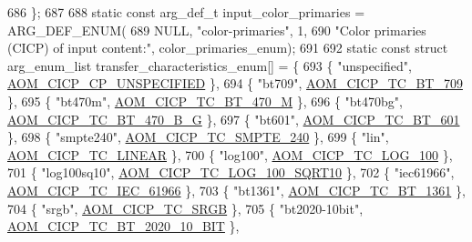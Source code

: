\begin{DoxyCodeInclude}
{{{{{{{686 \};
687 
688 \textcolor{keyword}{static} \textcolor{keyword}{const} arg\_def\_t input\_color\_primaries = ARG\_DEF\_ENUM(
689     NULL, \textcolor{stringliteral}{"color-primaries"}, 1,
690     \textcolor{stringliteral}{"Color primaries (CICP) of input content:"}, color\_primaries\_enum);
691 
692 \textcolor{keyword}{static} \textcolor{keyword}{const} \textcolor{keyword}{struct }arg\_enum\_list transfer\_characteristics\_enum[] = \{
693   \{ \textcolor{stringliteral}{"unspecified"}, \hyperlink{aom__image_8h_a5267ad095a088ece3499336812503cefa0835a3af8e6ffc6df298b6e64f878431}{AOM\_CICP\_CP\_UNSPECIFIED} \},
694   \{ \textcolor{stringliteral}{"bt709"}, \hyperlink{aom__image_8h_a30655997e3fb79889ee23eb294cb1992affe340e422646b7d70ef91edd6a8053c}{AOM\_CICP\_TC\_BT\_709} \},
695   \{ \textcolor{stringliteral}{"bt470m"}, \hyperlink{aom__image_8h_a30655997e3fb79889ee23eb294cb1992a356d6943d11d88e7a42370c1c698c214}{AOM\_CICP\_TC\_BT\_470\_M} \},
696   \{ \textcolor{stringliteral}{"bt470bg"}, \hyperlink{aom__image_8h_a30655997e3fb79889ee23eb294cb1992a7a347c6d5605db0a6ee89cc81dec0b37}{AOM\_CICP\_TC\_BT\_470\_B\_G} \},
697   \{ \textcolor{stringliteral}{"bt601"}, \hyperlink{aom__image_8h_a30655997e3fb79889ee23eb294cb1992a5b51bfcf0f3779a7d907ac45ee4067a4}{AOM\_CICP\_TC\_BT\_601} \},
698   \{ \textcolor{stringliteral}{"smpte240"}, \hyperlink{aom__image_8h_a30655997e3fb79889ee23eb294cb1992ac3b5e95e3400830c334268fca69a1226}{AOM\_CICP\_TC\_SMPTE\_240} \},
699   \{ \textcolor{stringliteral}{"lin"}, \hyperlink{aom__image_8h_a30655997e3fb79889ee23eb294cb1992a99ebdb0b1a35e0bf25808f851aa80a35}{AOM\_CICP\_TC\_LINEAR} \},
700   \{ \textcolor{stringliteral}{"log100"}, \hyperlink{aom__image_8h_a30655997e3fb79889ee23eb294cb1992a54ec8cfad46215d855696bafe371ffe1}{AOM\_CICP\_TC\_LOG\_100} \},
701   \{ \textcolor{stringliteral}{"log100sq10"}, \hyperlink{aom__image_8h_a30655997e3fb79889ee23eb294cb1992a7d79c257042a5958bafa6b5ccfbd96cb}{AOM\_CICP\_TC\_LOG\_100\_SQRT10} \},
702   \{ \textcolor{stringliteral}{"iec61966"}, \hyperlink{aom__image_8h_a30655997e3fb79889ee23eb294cb1992a57f92f410badf8a43b19df18edc9b8b9}{AOM\_CICP\_TC\_IEC\_61966} \},
703   \{ \textcolor{stringliteral}{"bt1361"}, \hyperlink{aom__image_8h_a30655997e3fb79889ee23eb294cb1992ac60ca749a2d0ca1c860d82f0825a3e2d}{AOM\_CICP\_TC\_BT\_1361} \},
704   \{ \textcolor{stringliteral}{"srgb"}, \hyperlink{aom__image_8h_a30655997e3fb79889ee23eb294cb1992a94553e773e3d3fb005236ed70eeedfea}{AOM\_CICP\_TC\_SRGB} \},
705   \{ \textcolor{stringliteral}{"bt2020-10bit"}, \hyperlink{aom__image_8h_a30655997e3fb79889ee23eb294cb1992a1ce5fbca5277266680d70bb7211646d6}{AOM\_CICP\_TC\_BT\_2020\_10\_BIT} \},
}}}}}}}
\end{DoxyCodeInclude}
